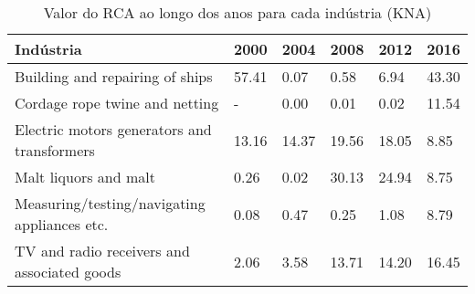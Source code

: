\begin{table}
\centering
\caption{Valor do RCA ao longo dos anos para cada indústria (KNA)}
\label{tab:ex3-tempo-KNA}
\begin{tabular}{p{6cm}p{1.5cm}p{1.5cm}p{1.5cm}p{1.5cm}p{1.5cm}}
\toprule
                                   Indústria &  2000 &  2004 &  2008 &  2012 &  2016 \\
\midrule
             Building and repairing of ships & 57.41 &  0.07 &  0.58 &  6.94 & 43.30 \\
              Cordage rope twine and netting &     - &  0.00 &  0.01 &  0.02 & 11.54 \\
 Electric motors generators and transformers & 13.16 & 14.37 & 19.56 & 18.05 &  8.85 \\
                       Malt liquors and malt &  0.26 &  0.02 & 30.13 & 24.94 &  8.75 \\
Measuring/testing/navigating appliances etc. &  0.08 &  0.47 &  0.25 &  1.08 &  8.79 \\
 TV and radio receivers and associated goods &  2.06 &  3.58 & 13.71 & 14.20 & 16.45 \\
\bottomrule
\end{tabular}
\end{table}

